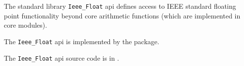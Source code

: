 
The standard library {\tt Ieee\_Float} api defines access to {\sc IEEE} 
 standard floating point 
functionality beyond core arithmetic functions (which are implemented in core modules).

The {\tt Ieee\_Float} api is implemented by the  package.

The {\tt Ieee\_Float} api source code is in .






